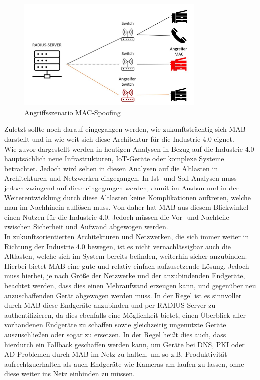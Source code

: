 \documentclass[conference]{IEEEtran}
\begin{document}

\begin{figure}[hbt]
	\centering
	\includegraphics[width=9cm]{figures/Angriffsszenario_Spoofing.jpg}
	\caption{Angriffsszenario MAC-Spoofing}
	\label{fig:mac_spoofing}
\end{figure}


Zuletzt sollte noch darauf eingegangen werden, wie zukunftsträchtig sich MAB darstellt und in wie weit sich diese Architektur für die Industrie 4.0 eignet.\\

Wie zuvor dargestellt werden in heutigen Analysen in Bezug auf die Industrie 4.0 hauptsächlich neue Infrastrukturen, IoT-Geräte oder komplexe Systeme betrachtet. Jedoch wird selten in diesen Analysen auf die Altlasten in Architekturen und Netzwerken eingegangen. In Ist- und Soll-Analysen muss jedoch zwingend auf diese eingegangen werden, damit im Ausbau und in der Weiterentwicklung durch diese Altlasten keine Komplikationen auftreten, welche man im Nachhinein auflösen muss. Von daher hat MAB aus diesem Blickwinkel einen Nutzen für die Industrie 4.0. Jedoch müssen die Vor- und Nachteile zwischen Sicherheit und Aufwand abgewogen werden.\\

In zukunftsorientierten Architekturen und Netzwerken, die sich immer weiter in Richtung der Industrie 4.0 bewegen, ist es nicht vernachlässigbar auch die Altlasten, welche sich im System bereits befinden, weiterhin sicher anzubinden. Hierbei bietet MAB eine gute und relativ einfach aufzusetzende Lösung. Jedoch muss hierbei, je nach Größe der Netzwerke und der anzubindenden Endgeräte, beachtet werden, dass dies einen Mehraufwand erzeugen kann, und gegenüber neu anzuschaffenden Gerät abgewogen werden muss. In der Regel ist es sinnvoller durch MAB diese Endgeräte anzubinden und per RADIUS-Server zu authentifizieren, da dies ebenfalls eine Möglichkeit bietet, einen Überblick aller vorhandenen Endgeräte zu schaffen sowie gleichzeitig ungenutzte Geräte auszuschließen oder sogar zu ersetzen. In der Regel heißt dies auch, dass hierdurch ein Fallback geschaffen werden kann, um Geräte bei DNS, PKI oder AD Problemen durch MAB im Netz zu halten, um so z.B. Produktivität aufrechtzuerhalten als auch Endgeräte wie Kameras am laufen zu lassen, ohne diese weiter ins Netz einbinden zu müssen.\\
\end{document}
